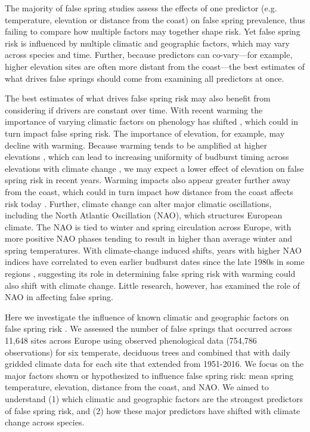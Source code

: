 \documentclass{article}\usepackage[]{graphicx}\usepackage[]{color}
\begin{document}
The majority of false spring studies assess the effects of one predictor (e.g. temperature, elevation or distance from the coast) on false spring prevalence, thus failing to compare how multiple factors may together shape risk. Yet false spring risk is influenced by multiple climatic and geographic factors, which may vary across species and time. Further, because predictors can co-vary---for example, higher elevation sites are often more distant from the coast---the best estimates of what drives false springs should come from examining all predictors at once. 

The best estimates of what drives false spring risk may also benefit from considering if drivers are constant over time. With recent warming the importance of varying climatic factors on phenology has shifted \citep[e.g.,][]{Cook2016,Gauzere2019}, which could in turn impact false spring risk. The importance of elevation, for example, may decline with warming. Because warming tends to be amplified at higher elevations \citep{Giorgi1997,Rangwala2012,Pepin2015}, which can lead to increasing uniformity of budburst timing across elevations with climate change \citep{Vitasse2018}, we may expect a lower effect of elevation on false spring risk in recent years. Warming impacts also appear greater further away from the coast, which could in turn impact how distance from the coast affects risk today \citep{Wypych2016a,Ma2018}. Further, climate change can alter major climatic oscillations, including the North Atlantic Oscillation (NAO), which structures European climate. The NAO  is tied to winter and spring circulation across Europe, with more positive NAO phases tending to result in higher than average winter and spring temperatures. With climate-change induced shifts, years with higher NAO indices have correlated to even earlier budburst dates since the late 1980s in some regions \citep{Chmielewski2001}, suggesting its role in determining false spring risk with warming could also shift with climate change. Little research, however, has examined the role of NAO in affecting false spring. 

Here we investigate the influence of known climatic and geographic factors on false spring risk \citep[defined here as when temperatures fell below -2.2$^{\circ}$ between estimated budburst and leafout for all species included in the study,][]{Schwartz1993}. We assessed the number of false springs that occurred across 11,648 sites across Europe using observed phenological data (754,786 observations) for six temperate, deciduous trees and combined that with daily gridded climate data for each site that extended from 1951-2016. We focus on the major factors shown or hypothesized to influence false spring risk: mean spring temperature, elevation, distance from the coast, and NAO. We aimed to understand (1) which climatic and geographic factors are the strongest predictors of false spring risk, and (2) how these major predictors have shifted with climate change across species. 
\end{document}
